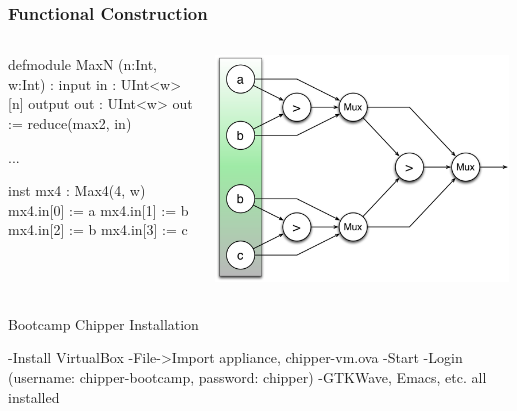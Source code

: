 \documentclass[xcolor=pdflatex,dvipsnames,table]{beamer}
\begin{document}
\begin{frame}[fragile]
\frametitle{Functional Construction}

\begin{columns}


{
\begin{stanza}
defmodule MaxN (n:Int, w:Int) :
  input in : UInt<w>[n]
  output out : UInt<w>
  out := reduce(max2, in)

...

inst mx4 : Max4(4, w)
mx4.in[0] := a
mx4.in[1] := b
mx4.in[2] := b
mx4.in[3] := c
\end{stanza}
}


\begin{center}
\includegraphics[width=0.99\textwidth]{figs/reduceMax.pdf} \\
\end{center}

\end{columns}

\end{frame}

% 

\begin{frame}[fragile]{Bootcamp Chipper Installation}
\begin{stanza}
-Install VirtualBox
-File->Import appliance, chipper-vm.ova
-Start
-Login (username: chipper-bootcamp, password: chipper)
-GTKWave, Emacs, etc. all installed
\end{stanza}
\end{frame}
\end{document}
